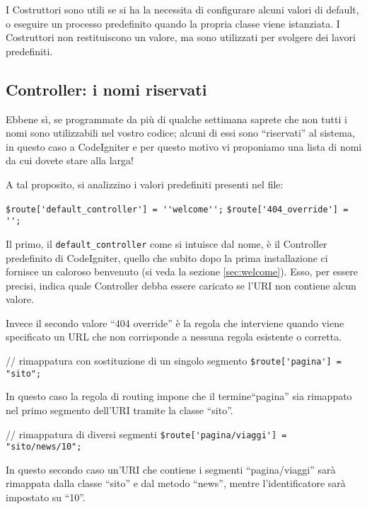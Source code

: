 I Costruttori sono utili se si ha la necessita di configurare alcuni valori di default, o eseguire un processo predefinito quando la propria classe viene istanziata. I Costruttori non restituiscono un valore, ma sono utilizzati per svolgere dei lavori predefiniti.

\subsection{Controller: i nomi riservati}
Ebbene sì, se programmate da più di qualche settimana saprete che non tutti i nomi sono utilizzabili nel vostro codice; alcuni di essi sono ``riservati'' al sistema, in questo caso a CodeIgniter e per questo motivo vi proponiamo una lista di nomi da cui dovete stare alla larga!

A tal proposito, si analizzino i valori predefiniti presenti nel file:

\begin{code}
\verb|$route['default_controller'] = ''welcome'';|
\verb|$route['404_override'] = '';|
\end{code}

Il primo, il \verb|default_controller| come si intuisce dal nome, è il Controller predefinito di CodeIgniter, quello che subito dopo la prima installazione ci fornisce un caloroso benvenuto (si veda la sezione \vref{sec:welcome}). Esso, per essere precisi, indica quale Controller debba essere caricato se l'URI non contiene alcun valore.

Invece il secondo valore ``404 override'' è la regola che interviene quando viene specificato un \ac{URL} che non corrisponde a nessuna regola esistente o corretta.

\begin{code}
// rimappatura con sostituzione di un singolo segmento
\verb|$route['pagina'] = "sito";|
\end{code}

In questo caso la regola di routing impone che il termine``pagina'' sia rimappato nel primo segmento dell'URI tramite la classe ``sito''. 

\begin{code}
// rimappatura di diversi segmenti
\verb|$route['pagina/viaggi'] = "sito/news/10";|
\end{code}

In questo secondo caso un'URI che contiene i segmenti ``pagina/viaggi'' sarà rimappata dalla classe ``sito'' e dal metodo ``news'', mentre l'identificatore sarà impostato su ``10''.

